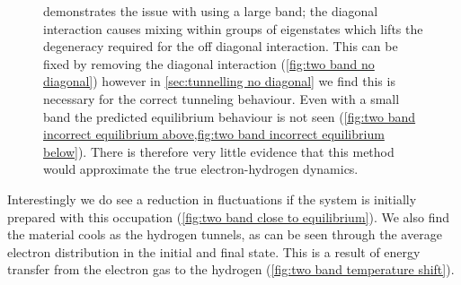\begin{figure}[htbp]
{        demonstrates the issue with
        using a large band; the diagonal
        interaction causes mixing within
        groups of eigenstates which
        lifts the degeneracy required for
        the off diagonal interaction.
        This can be fixed by removing
        the diagonal interaction
        (\cref{fig:two band no diagonal})
        however in
        \cref{sec:tunnelling no diagonal}
        we find this is
        necessary for the correct
        tunneling behaviour.
        Even with a small band
        the
        predicted equilibrium
        behaviour is not seen
        (\cref{fig:two band incorrect equilibrium above,fig:two band incorrect equilibrium below}).
        There is therefore very
        little evidence that
        this method would
        approximate the true
        electron-hydrogen dynamics.
    }\label{fig:issue with two band approach}
\end{figure}
Interestingly we do see a reduction in
fluctuations if the system is initially
prepared with this occupation
(\cref{fig:two band close to equilibrium}).
We also find the material cools
as the hydrogen tunnels, as can be seen
through the average electron distribution in
the initial and final state. This is a
result of energy transfer from the
electron gas to the hydrogen
(\cref{fig:two band temperature shift}).

